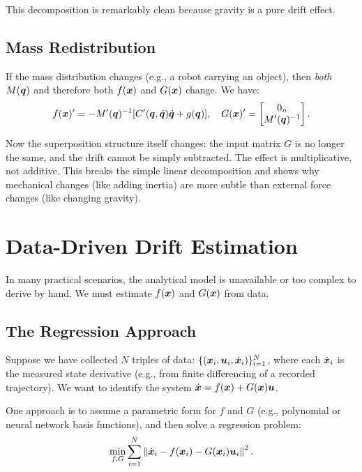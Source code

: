 This decomposition is remarkably clean because gravity is a pure drift effect.

\subsection{Mass Redistribution}

If the mass distribution changes (e.g., a robot carrying an object), then \emph{both}
$M(\bm{q})$ and therefore both $f(\bm{x})$ and $G(\bm{x})$ change. We have:
\begin{equation}
f(\bm{x})' = -M'(\bm{q})^{-1}[C'(\bm{q},\dot{\bm{q}})\dot{\bm{q}} + g(\bm{q})],
\quad
G(\bm{x})' = \begin{bmatrix} 0_n \\ M'(\bm{q})^{-1} \end{bmatrix}.
\label{eq:ch7:mass-redistribution}
\end{equation}

Now the superposition structure itself changes: the input matrix $G$ is no longer the same,
and the drift cannot be simply subtracted. The effect is multiplicative, not additive. This
breaks the simple linear decomposition and shows why mechanical changes (like adding inertia)
are more subtle than external force changes (like changing gravity).

\section{Data-Driven Drift Estimation}

In many practical scenarios, the analytical model is unavailable or too complex to derive
by hand. We must estimate $f(\bm{x})$ and $G(\bm{x})$ from data.

\subsection{The Regression Approach}

Suppose we have collected $N$ triples of data: $\{(\bm{x}_i, \bm{u}_i, \dot{\bm{x}}_i)\}_{i=1}^N$,
where each $\dot{\bm{x}}_i$ is the measured state derivative (e.g., from finite differencing of
a recorded trajectory). We want to identify the system $\dot{\bm{x}} = f(\bm{x}) + G(\bm{x})\bm{u}$.

One approach is to assume a parametric form for $f$ and $G$ (e.g., polynomial or neural
network basis functions), and then solve a regression problem:
\begin{equation}
\min_{f, G} \sum_{i=1}^N \left\lVert \dot{\bm{x}}_i - f(\bm{x}_i) - G(\bm{x}_i)\bm{u}_i \right\rVert^2.
\label{eq:ch7:regression}
\end{equation}

